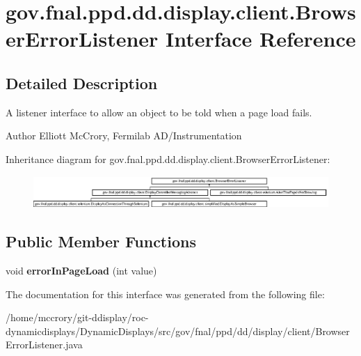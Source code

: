 \hypertarget{interfacegov_1_1fnal_1_1ppd_1_1dd_1_1display_1_1client_1_1BrowserErrorListener}{\section{gov.\-fnal.\-ppd.\-dd.\-display.\-client.\-Browser\-Error\-Listener Interface Reference}
\label{interfacegov_1_1fnal_1_1ppd_1_1dd_1_1display_1_1client_1_1BrowserErrorListener}
}


\subsection{Detailed Description}
A listener interface to allow an object to be told when a page load fails.

\begin{DoxyAuthor}{Author}
Elliott Mc\-Crory, Fermilab A\-D/\-Instrumentation 
\end{DoxyAuthor}
Inheritance diagram for gov.\-fnal.\-ppd.\-dd.\-display.\-client.\-Browser\-Error\-Listener\-:\begin{figure}[H]
\begin{center}
\leavevmode
\includegraphics[height=1.209503cm]{interfacegov_1_1fnal_1_1ppd_1_1dd_1_1display_1_1client_1_1BrowserErrorListener}
\end{center}
\end{figure}
\subsection*{Public Member Functions}
\begin{DoxyCompactItemize}
\item 
\hypertarget{interfacegov_1_1fnal_1_1ppd_1_1dd_1_1display_1_1client_1_1BrowserErrorListener_a3e9b377582160013a1ff99cfe29765f3}{void {\bfseries error\-In\-Page\-Load} (int value)}\label{interfacegov_1_1fnal_1_1ppd_1_1dd_1_1display_1_1client_1_1BrowserErrorListener_a3e9b377582160013a1ff99cfe29765f3}

\end{DoxyCompactItemize}


The documentation for this interface was generated from the following file\-:\begin{DoxyCompactItemize}
\item 
/home/mccrory/git-\/ddisplay/roc-\/dynamicdisplays/\-Dynamic\-Displays/src/gov/fnal/ppd/dd/display/client/Browser\-Error\-Listener.\-java\end{DoxyCompactItemize}
